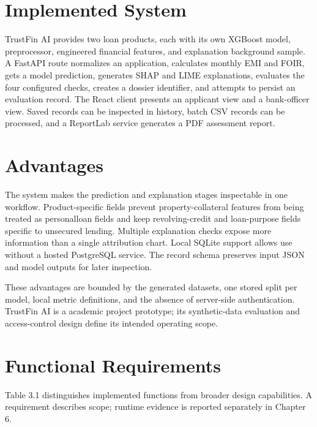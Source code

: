 \documentclass[12pt,a4paper]{report}
\begin{document}
\section{Implemented System}
TrustFin AI provides two loan products, each with its own XGBoost model, preprocessor, engineered financial features, and explanation background sample. A FastAPI route normalizes an application, calculates monthly EMI and FOIR, gets a model prediction, generates SHAP and LIME explanations, evaluates the four configured checks, creates a dossier identifier, and attempts to persist an evaluation record. The React client presents an applicant view and a bank-officer view. Saved records can be inspected in history, batch CSV records can be processed, and a ReportLab service generates a PDF assessment report.

\section{Advantages}
The system makes the prediction and explanation stages inspectable in one workflow. Product-specific fields prevent property-collateral features from being treated as personalloan fields and keep revolving-credit and loan-purpose fields specific to unsecured lending. Multiple explanation checks expose more information than a single attribution chart. Local SQLite support allows use without a hosted PostgreSQL service. The record schema preserves input JSON and model outputs for later inspection.

These advantages are bounded by the generated datasets, one stored split per model, local metric definitions, and the absence of server-side authentication. TrustFin AI is a academic project prototype; its synthetic-data evaluation and access-control design define its intended operating scope.

\section{Functional Requirements}
Table 3.1 distinguishes implemented functions from broader design capabilities. A requirement describes scope; runtime evidence is reported separately in Chapter 6.
\end{document}
